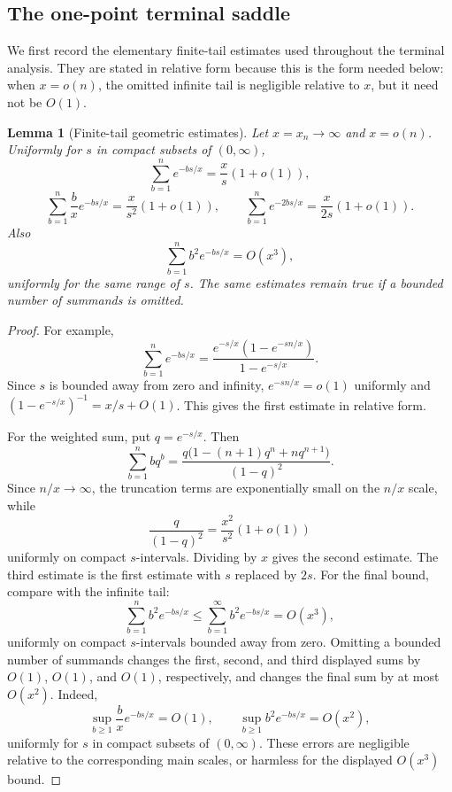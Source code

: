 \documentclass[11pt]{article}
\newtheorem{lemma}[theorem]{Lemma}
\theoremstyle{remark}
\begin{document}
\subsection{The one-point terminal saddle}

We first record the elementary finite-tail estimates used throughout the terminal analysis.  They are stated in relative form because this is the form needed below: when \(x=o(n)\), the omitted infinite tail is negligible relative to \(x\), but it need not be \(O(1)\).

\begin{lemma}[Finite-tail geometric estimates]\label{lem:terminal-geometric}
Let \(x=x_n\to\infty\) and \(x=o(n)\).  Uniformly for \(s\) in compact subsets of \((0,\infty)\),
\[
        \sum_{b=1}^n e^{-bs/x}=\frac{x}{s}(1+o(1)),
\]
\[
        \sum_{b=1}^n \frac{b}{x}e^{-bs/x}=\frac{x}{s^2}(1+o(1)),
        \qquad
        \sum_{b=1}^n e^{-2bs/x}=\frac{x}{2s}(1+o(1)).
\]
Also
\[
        \sum_{b=1}^n b^2 e^{-bs/x}=O(x^3),
\]
uniformly for the same range of \(s\).  The same estimates remain true if a bounded number of summands is omitted.
\end{lemma}

\begin{proof}
For example,
\[
        \sum_{b=1}^n e^{-bs/x}
        =\frac{e^{-s/x}(1-e^{-sn/x})}{1-e^{-s/x}}.
\]
Since \(s\) is bounded away from zero and infinity, \(e^{-sn/x}=o(1)\) uniformly and \((1-e^{-s/x})^{-1}=x/s+O(1)\).  This gives the first estimate in relative form.

For the weighted sum, put \(q=e^{-s/x}\).  Then
\[
        \sum_{b=1}^n bq^b
        =
        \frac{q\bigl(1-(n+1)q^n+nq^{n+1}\bigr)}{(1-q)^2}.
\]
Since \(n/x\to\infty\), the truncation terms are exponentially small on the \(n/x\) scale, while
\[
        \frac{q}{(1-q)^2}=\frac{x^2}{s^2}(1+o(1))
\]
uniformly on compact \(s\)-intervals.  Dividing by \(x\) gives the second estimate.  The third estimate is the first estimate with \(s\) replaced by \(2s\).  For the final bound, compare with the infinite tail:
\[
        \sum_{b=1}^n b^2e^{-bs/x}\le \sum_{b=1}^{\infty}b^2e^{-bs/x}=O(x^3),
\]
uniformly on compact \(s\)-intervals bounded away from zero.  Omitting a bounded number of summands changes the first, second, and third displayed sums by \(O(1)\), \(O(1)\), and \(O(1)\), respectively, and changes the final sum by at most \(O(x^2)\).  Indeed,
\[
        \sup_{b\ge1}\frac{b}{x}e^{-bs/x}=O(1),
        \qquad
        \sup_{b\ge1}b^2e^{-bs/x}=O(x^2),
\]
uniformly for \(s\) in compact subsets of \((0,\infty)\).  These errors are negligible relative to the corresponding main scales, or harmless for the displayed \(O(x^3)\) bound.
\end{proof}
\end{document}
